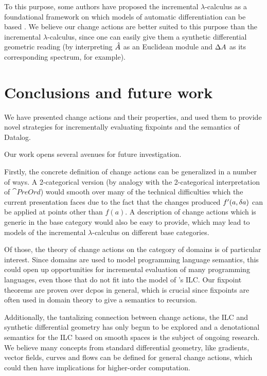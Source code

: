 To this purpose, some authors have proposed the incremental $\lambda$-calculus
as a foundational framework on which models of automatic differentiation can
be based \autocite{kelly2016evolving}. We believe our change actions are better suited
to this purpose than the incremental $\lambda$-calculus, since one can easily give them a
synthetic differential geometric reading (by interpreting $\hat{A}$ as an Euclidean module and $\Delta A$
as its corresponding spectrum, for example).

\section{Conclusions and future work}

We have presented change actions and their properties, and used them to provide novel
strategies for incrementally evaluating fixpoints and the semantics of Datalog.

Our work opens several avenues for future investigation.

Firstly, the concrete definition of change actions can be generalized in a number of
ways. A 2-categorical version (by analogy with the 2-categorical interpretation
of $\cat{PreOrd}$) would smooth over many of the technical difficulties which
the current presentation faces due to the fact that the changes produced
$f'(a, \delta a)$ can be applied at points other than $f(a)$.
A description of change actions which is generic in
the base category would also be easy to provide, which may lead to models of
the incremental $\lambda$-calculus on different base categories. 

Of those, the theory of change actions on the category of domains is of particular interest. Since
domains are used to model programming language semantics, this could
open up opportunities for incremental evaluation of many programming languages,
even those that do not fit into the model of \citeauthor{cai2014changes}'s ILC.
Our fixpoint theorems are proven over dcpos in general, which is crucial since
fixpoints are often used in domain theory to give a semantics to recursion.

Additionally, the tantalizing connection between change actions, the ILC and synthetic
differential geometry has only begun to be explored and a denotational semantics for the
ILC based on smooth spaces is the subject of ongoing research. We believe many concepts
from standard differential geometry, like gradients, vector fields, curves and flows can
be defined for general change actions, which could then have implications for higher-order
computation.

